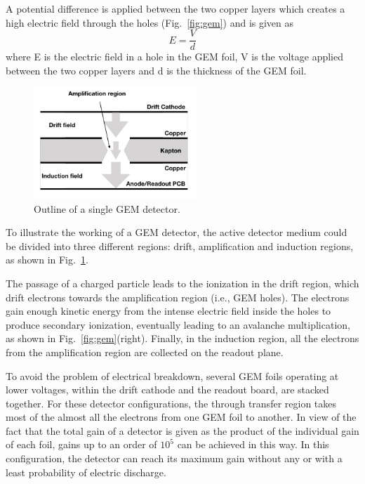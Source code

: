 A potential difference is applied between the two copper layers which creates a high electric field through the holes (Fig.~\ref{fig:gem}) and is given as
\begin{equation}
    E = \frac{V}{d}
\end{equation}
where E is the electric field in a hole in the GEM foil, V is the voltage applied between the two copper layers and d is the thickness of the GEM foil.
\begin{figure}[htbp]
    \centering
    \includegraphics[width=0.55\textwidth]{figures/GEM/SingleGEM_Detector.jpeg}
    \caption{Outline of a single GEM detector.}
    \label{fig:gemOutline}
\end{figure}

To illustrate the working of a GEM detector, the active detector medium could be divided into three different regions: drift, amplification and induction regions, as shown in Fig.~\ref{fig:gemOutline}.

The passage of a charged particle leads to the ionization in the drift region, which drift electrons towards the amplification region (i.e., GEM holes). 
The electrons gain enough kinetic energy from the intense electric field inside the holes to produce secondary ionization, eventually leading to an avalanche multiplication, as shown in Fig.~\ref{fig:gem}(right).
Finally, in the induction region, all the electrons from the amplification region are collected on the readout plane. 

To avoid the problem of electrical breakdown, several GEM foils operating at lower voltages, within the drift cathode and the readout board, are stacked together.
For these detector configurations, the through transfer region takes most of the almost all the electrons from one GEM foil to another.
In view of the fact that the total gain of a detector is given as the product of the individual gain of each foil, gains up to an order of $10^5$ can be achieved in this way.
In this configuration, the detector can reach its maximum gain without any or with a least probability of electric discharge.

